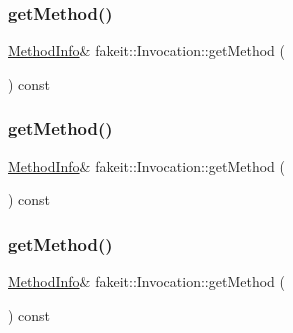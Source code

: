 \subsubsection{\texorpdfstring{getMethod()}{getMethod()}\hspace{0.1cm}{\footnotesize\ttfamily [1/9]}}
{\footnotesize\ttfamily \mbox{\hyperlink{structfakeit_1_1MethodInfo}{Method\+Info}}\& fakeit\+::\+Invocation\+::get\+Method (\begin{DoxyParamCaption}{ }\end{DoxyParamCaption}) const\hspace{0.3cm}{\ttfamily [inline]}}

\mbox{\label{structfakeit_1_1Invocation_ae0b909794e14d6bba7db6baaef471865}} 
\subsubsection{\texorpdfstring{getMethod()}{getMethod()}\hspace{0.1cm}{\footnotesize\ttfamily [2/9]}}
{\footnotesize\ttfamily \mbox{\hyperlink{structfakeit_1_1MethodInfo}{Method\+Info}}\& fakeit\+::\+Invocation\+::get\+Method (\begin{DoxyParamCaption}{ }\end{DoxyParamCaption}) const\hspace{0.3cm}{\ttfamily [inline]}}

\mbox{\label{structfakeit_1_1Invocation_ae0b909794e14d6bba7db6baaef471865}} 
\subsubsection{\texorpdfstring{getMethod()}{getMethod()}\hspace{0.1cm}{\footnotesize\ttfamily [3/9]}}
{\footnotesize\ttfamily \mbox{\hyperlink{structfakeit_1_1MethodInfo}{Method\+Info}}\& fakeit\+::\+Invocation\+::get\+Method (\begin{DoxyParamCaption}{ }\end{DoxyParamCaption}) const\hspace{0.3cm}{\ttfamily [inline]}}

